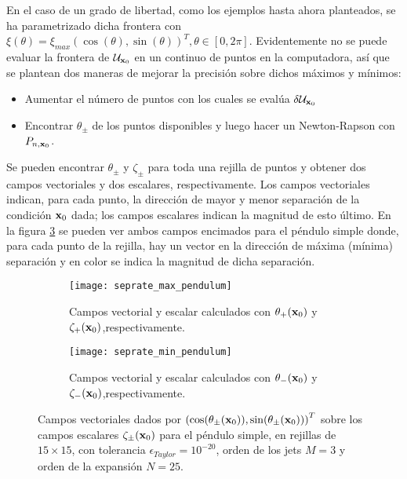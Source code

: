 En el caso de un grado de libertad, como los ejemplos hasta ahora planteados, se ha parametrizado dicha frontera con $\xi(\theta) = \xi_{max} \left( \cos(\theta), \sin(\theta) \right)^T, \theta \in [0,2\pi]$. Evidentemente no se puede evaluar la frontera de $\mathcal{U}_{\mathbf{x}_0}$ en un continuo de puntos en la computadora, así que se plantean dos maneras de mejorar la precisión sobre dichos máximos y mínimos: 
\begin{itemize}
\item Aumentar el número de puntos con los cuales se evalúa $\delta \mathcal{U}_{\mathbf{x}_0}$
\item Encontrar $\theta_{\pm}$ de los puntos disponibles y luego hacer un Newton-Rapson con $P_{n,\mathbf{x}_0}$. 
\end{itemize} 

Se pueden encontrar $\theta_\pm$ y $\zeta_\pm$ para toda una rejilla de puntos y obtener dos campos vectoriales y dos escalares, respectivamente. Los campos vectoriales indican, para cada punto, la dirección de mayor y menor separación de la condición $\mathbf{x}_0$ dada; los campos escalares indican la magnitud de esto último. En la figura \ref{fig:seprate_pendulum} se pueden ver ambos campos encimados para el péndulo simple donde, para cada punto de la rejilla, hay un vector en la dirección de máxima (mínima) separación y en color se indica la magnitud de dicha separación.

\begin{figure}[h!]
\centering
\begin{subfigure}{0.49\textwidth}
	\centering
	\texttt{[image: seprate\_max\_pendulum]}
	\caption{Campos vectorial y escalar calculados con $\theta_+(\mathbf{x}_0)$ y $\zeta_+(\mathbf{x}_0)$,respectivamente.}
	\label{fig:seprate_max_pendulum}
\end{subfigure}
%
\begin{subfigure}{0.49\textwidth}
	\centering
	\texttt{[image: seprate\_min\_pendulum]}
	\caption{Campos vectorial y escalar calculados con $\theta_-(\mathbf{x}_0)$ y $\zeta_-(\mathbf{x}_0)$,respectivamente.}
	\label{fig:seprate_min_pendulum}
\end{subfigure}
\caption{ Campos vectoriales dados por $\left( \cos(\theta_\pm(\mathbf{x}_0)),\sin(\theta_\pm(\mathbf{x}_0)) \right)^T$ sobre los campos escalares $\zeta_\pm(\mathbf{x}_0)$ para el péndulo simple, en rejillas de $15\times15$, con tolerancia $\epsilon_{Taylor} = 10^{-20}$, orden de los jets $M=3$ y orden de la expansión $N=25$. }
\label{fig:seprate_pendulum}
\end{figure}

